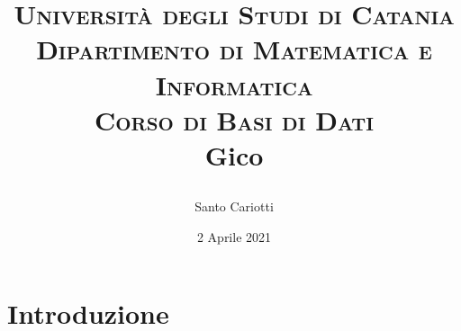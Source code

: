 

\title{
    \small\textsc{Università degli Studi di Catania\\Dipartimento di Matematica e Informatica\\Corso di Basi di Dati}\\
    \Huge\textbf{Gico}\\
    \author{Santo Cariotti}
    \date{2 Aprile 2021}
}


\maketitle

\renewcommand{\contentsname}{Indice}
\tableofcontents{}


\chapter{Introduzione}



